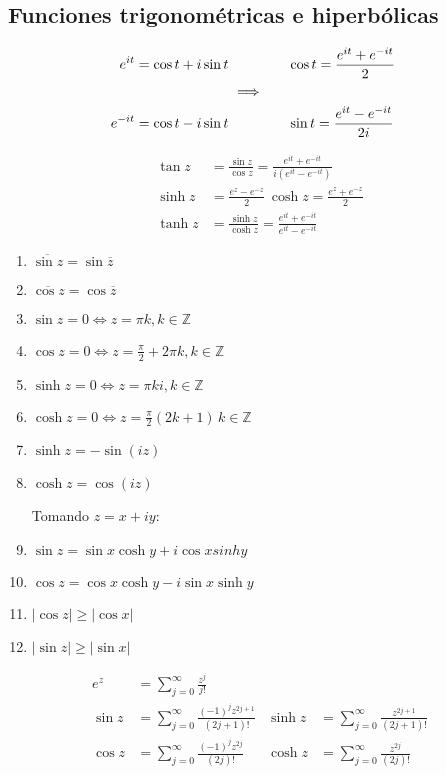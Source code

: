 \documentclass[10pt]{book}
\newcommand{\Z}{\mathbb{Z}}
\begin{document}
\subsection{Funciones trigonométricas e hiperbólicas}
\begin{align*}
e^{it} = \cos t + i\sin t &  \hspace{1.5cm} \cos t = \frac{e^{it}+e^{-it}}{2} \\
&\ \Longrightarrow&  \\
e^{-it} = \cos t - i\sin t & \hspace{1.5cm}  \sin t = \frac{e^{it}-e^{-it}}{2i}
\end{align*}

\begin{align*}
\tan z &= \frac{\sin z}{\cos z} = \frac{e^{it}+e^{-it}}{i(e^{it}-e^{-it})}\\
\sinh z &= \frac{e^{z}-e^{-z}}{2} \  \cosh z = \frac{e^{z}+e^{-z}}{2} \\
\tanh z &= \frac{\sinh z}{\cosh z} = \frac{e^{it}+e^{-it}}{e^{it}-e^{-it}}
\end{align*}


\begin{enumerate}
\item $\overline{\sin z} = \sin \overline{z}$
\item $\overline{\cos z} = \cos \overline{z}$
\item $\sin z = 0 \Leftrightarrow z = \pi k, k \in\Z$
\item $\cos z = 0 \Leftrightarrow z = \frac{\pi}{2}+2\pi k, k\in\Z$
\item $\sinh z = 0 \Leftrightarrow z = \pi ki, k \in\Z$
\item $\cosh z = 0 \Leftrightarrow z = \frac{\pi}{2}(2k+1)\, k\in\Z$
\item $\sinh z = -\sin(iz)$
\item $\cosh z = \cos(iz)$

Tomando $z = x+iy$:
\item $\sin z = \sin x\cosh y + i\cos x sinh y$
\item $\cos z = \cos x\cosh y -i\sin x \sinh y$
\item $|\cos z|\geq |\cos x|$
\item $|\sin z|\geq |\sin x|$
\end{enumerate}


\begin{align*}
e^z &= \sum_{j=0}^{\infty} \frac{z^j}{j!}\\
\sin z &= \sum_{j=0}^{\infty} \frac{(-1)^j z^{2j+1}}{(2j+1)!} &\sinh z &= \sum_{j=0}^{\infty} \frac{z^{2j+1}}{(2j+1)!} \\
\cos z &= \sum_{j=0}^{\infty} \frac{(-1)^j z^{2j}}{(2j)!}   &\cosh z &= \sum_{j=0}^{\infty} \frac{z^{2j}}{(2j)!}  
\end{align*}
\end{document}
